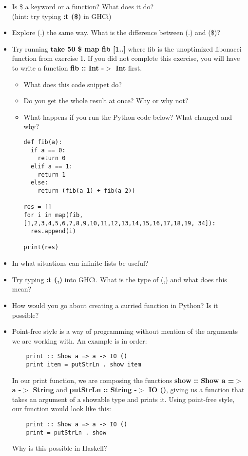 \documentclass{article}
\begin{document}
\begin{itemize}
    \item Is \$ a keyword or a function? What does it do?\\ (hint: try typing \textbf{:t (\$)} in GHCi)
    \item Explore (.) the same way. What is the difference between (.) and (\$)?
    \item Try running \textbf{take 50 \$ map fib [1..]} where fib is the unoptimized fibonacci function from exercise 1. If you did not complete this exercise, you will have to write a function \textbf{fib :: Int -$>$ Int} first.\\
    \begin{itemize}
        \item What does this code snippet do?
        \item Do you get the whole result at once? Why or why not?
        \item What happens if you run the Python code below? What changed and why?
\lstset{language=Python}
\begin{lstlisting}
def fib(a):
  if a == 0:
    return 0
  elif a == 1:
    return 1
  else:
    return (fib(a-1) + fib(a-2))

res = []
for i in map(fib, [1,2,3,4,5,6,7,8,9,10,11,12,13,14,15,16,17,18,19, 34]):
  res.append(i)

print(res)
\end{lstlisting}
    \end{itemize}
    \item In what situations can infinite lists be useful?
    \item Try typing \textbf{:t (,)} into GHCi. What is the type of (,) and what does this mean?
    \item How would you go about creating a curried function in Python? Is it possible?
    \item Point-free style is a way of programming without mention of the arguments we are working with. An example is in order:
    \lstset{language=Haskell}
    \begin{lstlisting}
    print :: Show a => a -> IO ()
    print item = putStrLn . show item
    \end{lstlisting}
    In our print function, we are composing the functions \textbf{show :: Show a =$>$ a -$>$ String} and \textbf{putStrLn :: String -$>$ IO ()}, giving us a function that takes an argument of a showable type and prints it. Using point-free style, our function would look like this:
    \lstset{language=Haskell}
    \begin{lstlisting}
    print :: Show a => a -> IO ()
    print = putStrLn . show
    \end{lstlisting}
    Why is this possible in Haskell?
\end{itemize}
\end{document}
